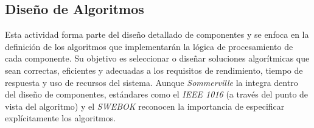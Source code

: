 \documentclass[12pt, letterpaper, oneside]{book}
\begin{document}
\subsection{Diseño de Algoritmos}
Esta actividad forma parte del diseño detallado de componentes y se enfoca en la definición de los algoritmos que implementarán la lógica de procesamiento de cada componente. Su objetivo es seleccionar o diseñar soluciones algorítmicas que sean correctas, eficientes y adecuadas a los requisitos de rendimiento, tiempo de respuesta y uso de recursos del sistema. Aunque \textit{Sommerville} \cite{Sommerville2015-px} la integra dentro del diseño de componentes, estándares como el \textit{IEEE 1016} \cite{1016_2009} (a través del punto de vista del algoritmo) y el \textit{SWEBOK} \cite{swebok2024} reconocen la importancia de especificar explícitamente los algoritmos.
\end{document}
